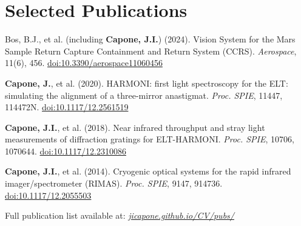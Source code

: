 \documentclass[letterpaper,11pt]{article}
\begin{document}
\section{Selected Publications}
\begin{itemize}[leftmargin=0.15in, label={}, noitemsep, topsep=0pt]
    \small{
        \item{Bos, B.J., et al. (including \textbf{Capone, J.I.}) (2024). Vision System for the Mars Sample Return Capture Containment and Return System (CCRS). \textit{Aerospace}, 11(6), 456. \href{https://doi.org/10.3390/aerospace11060456}{doi:10.3390/aerospace11060456}}
          \item{\textbf{Capone, J.}, et al. (2020). HARMONI: first light spectroscopy for the ELT: simulating the alignment of a three-mirror anastigmat. \textit{Proc. SPIE}, 11447, 114472N. \href{https://doi.org/10.1117/12.2561519}{doi:10.1117/12.2561519}}
          \item{\textbf{Capone, J.I.}, et al. (2018). Near infrared throughput and stray light measurements of diffraction gratings for ELT-HARMONI. \textit{Proc. SPIE}, 10706, 1070644. \href{https://doi.org/10.1117/12.2310086}{doi:10.1117/12.2310086}}
          \item{\textbf{Capone, J.I.}, et al. (2014). Cryogenic optical systems for the rapid infrared imager/spectrometer (RIMAS). \textit{Proc. SPIE}, 9147, 914736. \href{https://doi.org/10.1117/12.2055503}{doi:10.1117/12.2055503}}
          \bigskip
          \item{Full publication list available at: \href{https://jicapone.github.io/CV/pubs/}{\textit{jicapone.github.io/CV/pubs/}}}
    }
\end{itemize}
\end{document}
